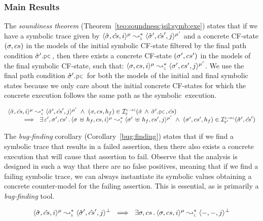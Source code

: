 \subsubsection{Main Results}
The \emph{soundiness theorem} (Theorem~\ref{teo:soundness:jsil:symb:exe}) states that if we have a symbolic trace given by 
$\transabssemrule{\sstate, \scs, i}{\sstate', \scs', j}{\mode}{\mode'}{\symbolic}$ and a concrete CF-state $(\sigma, cs)$
in the models of the initial symbolic CF-state filtered by the final path condition $\sstate'.\pcsel$,  
then there exists a concrete CF-state $(\sigma', cs')$ in the models of the final symbolic CF-state, such that: 
$\transabssemrule{\jstate, \cs, i}{\jstate', \cs', j}{\mode}{\mode'}{\concrete}$. 
We use the final path condition $\sstate'.\pcsel$ for both the models of the initial and final 
symbolic states because we only care about the initial concrete CF-states for which 
the concrete execution follows the same path as the symbolic~execution. 

\begin{theorem}[Soundiness]\label{teo:soundness:jsil:symb:exe}
$$
\begin{array}{l}
\transabssemrule{\sstate, \scs, i}{\sstate', \scs', j}{\mode}{\mode'}{\symbolic}  \ \wedge \ (\jstate, \cs, \heap_f) \in \interpret{\symbconc}{\senv}(\sstate \, \wedge \, \sstate'.\pcsel, \scs) \\ \quad \quad 
    \ \implies \ \exists \, \senv', \jstate', \cs' \, . \, 
        \transabssemrule{\jstate \dunion \heap_f, \cs, i}{\jstate' \dunion \heap_f, \cs', j}{\mode}{\mode'}{\concrete}
               \ \wedge \ (\jstate', \cs', \heap_f) \in \interpret{\symbconc}{\senv'}(\sstate', \scs')
\end{array}
$$
\end{theorem}

The \emph{bug-finding} corollary (Corollary~\ref{bug:finding}) states that if 
we find a symbolic trace that results in a failed assertion, 
then there also exists a concrete execution that will cause that assertion to fail.
Observe that the analysis is designed in such a way that there are no false positives, 
meaning that if we find a failing symbolic trace,
we can always instantiate its symbolic values obtaining a concrete counter-model for the 
failing assertion. This is essential, as \cosette is primarily a \emph{bug-finding} tool.


\begin{corollary}\label{bug:finding}
$$
\transabssemrule{\sstate, \scs, i}{\sstate', \scs', j}{\mode}{\bot}{\symbolic}  
      \ \implies \  \exists \jstate, \cs \, . \, \transabssemrule{\jstate, \cs, i}{-, -, j}{\mode}{\bot}{\concrete} 
$$
\end{corollary}

